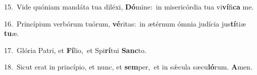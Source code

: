 {\numbfont\textcolor{\numbcolor}{15.}}~Vide quóniam mandáta tua diléxi, \textbf{Dó}\-mine:~\star in misericórdia tua vi\-\textbf{ví}\-fi\textbf{ca} me.\par
{\numbfont\textcolor{\numbcolor}{16.}}~Princípium verbórum tuórum, \textbf{vé}\-ritas:~\star in ætérnum ómnia judícia jus\-\textbf{tí}\-tiæ \textbf{tu}\-æ.\par
{\numbfont\textcolor{\numbcolor}{17.}}~Glória Patri, et \textbf{Fí}\-lio,~\star et Spi\-\textbf{rí}\-tui \textbf{Sanc}\-to.\par
{\numbfont\textcolor{\numbcolor}{18.}}~Sicut erat in princípio, et nunc, et \textbf{sem}\-per,~\star et in sǽcula sæcu\-\textbf{ló}\-rum. \textbf{A}\-men.\par
